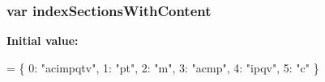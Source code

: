 \subsubsection[{index\+Sections\+With\+Content}]{\setlength{\rightskip}{0pt plus 5cm}var index\+Sections\+With\+Content}\label{searchdata_8js_a6250af3c9b54dee6efc5f55f40c78126}
{\bfseries Initial value\+:}
\begin{DoxyCode}
=
\{
  0: \textcolor{stringliteral}{"acimpqtv"},
  1: \textcolor{stringliteral}{"pt"},
  2: \textcolor{stringliteral}{"m"},
  3: \textcolor{stringliteral}{"acmp"},
  4: \textcolor{stringliteral}{"ipqv"},
  5: \textcolor{stringliteral}{"c"}
\}
\end{DoxyCode}
